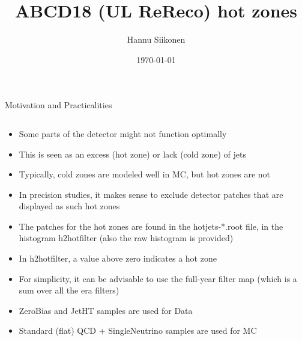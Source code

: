 \documentclass[9pt]{beamer}
\title[ABCD18 (UL ReReco) hot zones]{ABCD18 (UL ReReco) hot zones}
\author{Hannu Siikonen}
\institute{Helsinki Institute of Physics \\ \vspace{0.25cm} Instructor Adj.~Prof.~Mikko~Voutilainen}
\date{\today}
\begin{document}
\begin{frame}[t]
\titlepage
\end{frame}

\begin{frame}[t]{Motivation and Practicalities}
\begin{columns}[T]
\begin{column}{\textwidth}
\begin{itemize}
 \item Some parts of the detector might not function optimally
 \item This is seen as an excess (hot zone) or lack (cold zone) of jets
 \item Typically, cold zones are modeled well in MC, but hot zones are not
 \item In precision studies, it makes sense to exclude detector patches that are displayed as such hot zones
 \item The patches for the hot zones are found in the hotjets-*.root file, in the histogram h2hotfilter (also the raw histogram is provided)
 \item In h2hotfilter, a value above zero indicates a hot zone
 \item For simplicity, it can be advisable to use the full-year filter map (which is a sum over all the era filters)
 \item ZeroBias and JetHT samples are used for Data
 \item Standard (flat) QCD + SingleNeutrino samples are used for MC
\end{itemize}
\end{column}
\end{columns}
\end{frame}
\end{document}
